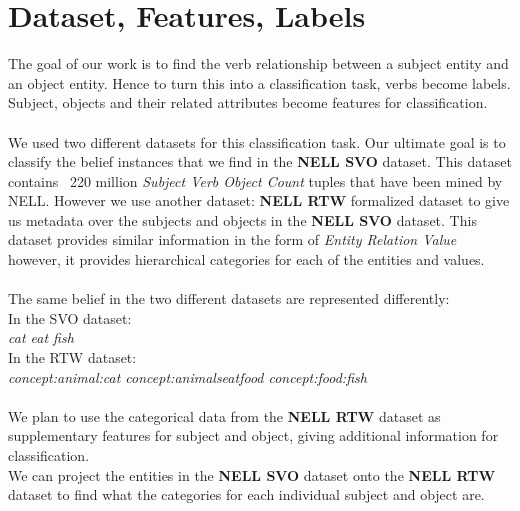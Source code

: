 \section{Dataset, Features, Labels}

The goal of our work is to find the verb relationship between a subject entity and an object entity. Hence to turn this into a classification task, verbs become labels. Subject, objects and their related attributes become features for classification.\\
\\
We used two different datasets for this classification task. Our ultimate goal is to classify the belief instances that we find in the \textbf{NELL SVO} dataset. This dataset contains ~220 million \emph{Subject Verb Object Count} tuples that have been mined by NELL. However we use another dataset: \textbf{NELL RTW} formalized dataset to give us metadata over the subjects and objects in the \textbf{NELL SVO} dataset. This dataset provides similar information in the form of \emph{Entity Relation Value} however, it provides hierarchical categories for each of the entities and values.\\
\\
The same belief in the two different datasets are represented differently:\\
In the SVO dataset:\\
\emph{cat eat fish}\\
In the RTW dataset:\\
\emph{concept:animal:cat concept:animalseatfood concept:food:fish}\\
\\
We plan to use the categorical data from the \textbf{NELL RTW} dataset as supplementary features for subject and object, giving additional information for classification.\\ We can project the entities in the \textbf{NELL SVO} dataset onto the \textbf{NELL RTW} dataset to find what the categories for each individual subject and object are.\\